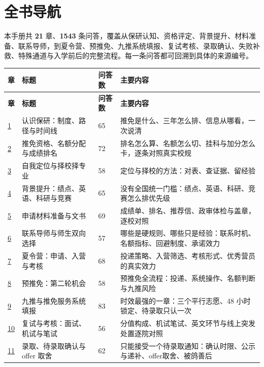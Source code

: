 \chapter*{全书导航}

\begin{keybox}
本手册共 \textbf{21} 章、\textbf{1543} 条问答，覆盖从保研认知、资格评定、背景提升、材料准备、联系导师，到夏令营、预推免、九推系统填报、复试考核、录取确认、失败补救、特殊通道与入学前后的完整流程。每一条问答都可回溯到具体的来源编号。
\end{keybox}

{\small
\begin{longtable}{p{1.1cm}p{5.4cm}p{1.4cm}p{7.2cm}}
\toprule
\textbf{章} & \textbf{标题} & \textbf{问答数} & \textbf{主要内容} \\ \midrule
\endfirsthead
\toprule \textbf{章} & \textbf{标题} & \textbf{问答数} & \textbf{主要内容} \\ \midrule
\endhead
\hyperref[ch01]{1} & 认识保研：制度、路径与时间线 & 65 & 推免是什么、三年怎么排、信息从哪看，一次说清 \\
\hyperref[ch02]{2} & 推免资格、名额分配与成绩排名 & 72 & 排名怎么算、名额怎么切、挂科与加分怎么卡，逐条对照真实校规 \\
\hyperref[ch03]{3} & 自我定位与择校择专业 & 58 & 定位与择校的方法：对表、查证据、留经验 \\
\hyperref[ch04]{4} & 背景提升：绩点、英语、科研与竞赛 & 65 & 没有全国统一门槛：绩点、英语、科研、竞赛怎么排优先级 \\
\hyperref[ch05]{5} & 申请材料准备与文书 & 69 & 成绩单、排名、推荐信、政审体检与盖章，逐校对照 \\
\hyperref[ch06]{6} & 联系导师与师生双向选择 & 57 & 哪些是硬规则、哪些只是经验：联系时机、名额指标、回避制度、承诺效力 \\
\hyperref[ch07]{7} & 夏令营：申请、入营与考核 & 68 & 投递策略、入营筛选、考核形式、优秀营员的真实效力 \\
\hyperref[ch08]{8} & 预推免：第二轮机会 & 58 & 预推免全流程：投递、系统操作、名额判断与九推风险 \\
\hyperref[ch09]{9} & 九推与推免服务系统填报 & 83 & 时效最强的一章：三个平行志愿、48 小时锁定、待录取只认一次 \\
\hyperref[ch10]{10} & 复试与考核：面试、机试与笔试 & 56 & 分值构成、机试笔试、英文环节与线上突发处置逐院对照 \\
\hyperref[ch11]{11} & 录取、待录取确认与 offer 取舍 & 62 & 只能接受一个待录取通知：确认时限、公示与递补、offer取舍、被鸽善后 \\

\end{longtable}}

